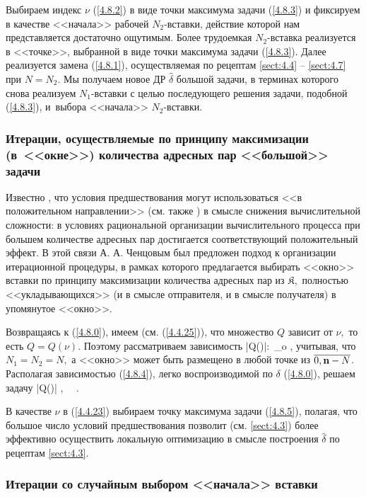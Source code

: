Выбираем индекс $\nu$ (\ref{4.8.2})
в виде точки максимума задачи (\ref{4.8.3})
и фиксируем в качестве <<начала>> рабочей $N_2$-вставки,
действие которой нам представляется достаточно ощутимым.
Более трудоемкая $N_2$-вставка реализуется в <<точке>>,
выбранной в виде точки максимума задачи (\ref{4.8.3}).
Далее реализуется замена (\ref{4.8.1}),
осуществляемая по рецептам \ref{sect:4.4} -- \ref{sect:4.7}
при $N=N_2$.
Мы получаем новое ДР
$\hat{\delta}$ большой задачи,
в терминах которого снова реализуем
$N_1$-вставки с целью последующего решения задачи,
подобной (\ref{4.8.3}),
и~выбора <<начала>> $N_2$-вставки.

\subsubsection*{
  Итерации, осуществляемые по принципу максимизации
  (в~<<окне>>) количества адресных пар
  <<большой>> задачи
}

Известно \cite[\S\,4.9]{Cha1`},
что условия предшествования могут использоваться
<<в положительном направлении>>
(см. также \cite[гл.~4]{Cha2`})
в смысле снижения вычислительной сложности:
в условиях рациональной организации вычислительного процесса при большем количестве адресных пар
достигается соответствующий положительный эффект.
В этой связи А. А. Ченцовым был предложен подход
к организации итерационной процедуры,
в рамках которого предлагается выбирать
<<окно>> вставки по
принципу максимизации количества адресных пар из $\mathfrak{K},$
полностью <<укладывающихся>>
(и в смысле отправителя, и в смысле получателя)
в упомянутое <<окно>>.


Возвращаясь к (\ref{4.8.0}),
имеем (см. (\ref{4.4.25})),
что множество $Q$ зависит от $\nu,$
то есть $Q = Q(\nu).$
Поэтому рассматриваем зависимость
\bfn
  \label{4.8.4}
  \tilde{\nu}\longmapsto |Q(\tilde{\nu})|:\, \longrightarrow \bbn_o
  ,
\efn
учитывая, что $N_1 = N_2 =N,$
а <<окно>> может быть размещено в любой точке из $\ov{0,\nn-N}$.
Располагая зависимостью (\ref{4.8.4}),
легко воспроизводимой по $\delta$
(\ref{4.8.0}),
решаем задачу
\bfn
  \label{4.8.5}
  |Q(\tilde{\nu})| \longrightarrow \max,\ \ \tilde{\nu}\in {}
  .
\efn

В качестве $\nu$ в (\ref{4.4.23})
выбираем точку максимума задачи (\ref{4.8.5}),
полагая, что большое число условий предшествования позволит
(см. \ref{sect:4.3})
более эффективно осуществить
локальную оптимизацию в смысле построения
$\hat{\delta}$ по рецептам \ref{sect:4.3}.

\subsubsection*{
  Итерации со случайным выбором <<начала>> вставки
}

